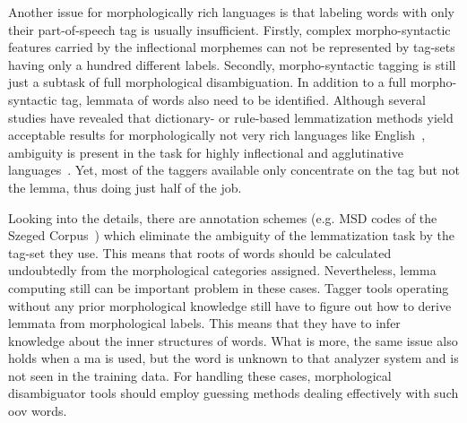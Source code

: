 Another issue for morphologically rich languages is that labeling words with only their part-of-speech tag is usually insufficient. 
Firstly, complex morpho-syntactic features carried by the inflectional morphemes can not be represented by tag-sets having only a hundred different labels. 
Secondly, morpho-syntactic tagging is still just a subtask of full morphological disambiguation. 
In addition to a full morpho-syntactic tag, lemmata of words also need to be identified. Although several studies have revealed that dictionary- or rule-based lemmatization methods yield acceptable results for morphologically not very rich languages like English~\cite{Porter1980,Plisson2004}, ambiguity is present in the task for highly inflectional and agglutinative languages~\cite{Jursic2007,Sak2007,Chrupaa2008}. 
Yet, most of the taggers available only concentrate on the tag but not the lemma, thus doing just half of the job.

Looking into the details, there are annotation schemes (e.g. MSD codes of the Szeged Corpus~\cite{Csendes2004}) which eliminate the ambiguity of the lemmatization task by the tag-set they use.
This means that roots of words should be calculated undoubtedly from the morphological categories assigned.
Nevertheless, lemma computing still can be important problem in these cases.
Tagger tools operating without any prior morphological knowledge still have to figure out how to derive lemmata from morphological labels.
This means that they have to infer knowledge about the inner structures of words.
What is more, the same issue also holds when a \acrshort{ma} is used, but the word is unknown to that analyzer system and is not seen in the training data.
For handling these cases, morphological disambiguator tools should employ guessing methods dealing effectively with such \acrlong{oov} words.

